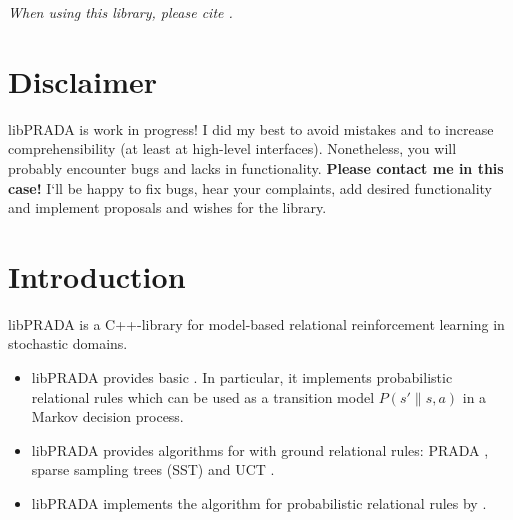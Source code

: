 \documentclass[10pt,twoside,twocolumn,fleqn]{article}
\begin{document}
\maketitle

\begin{center}
\emph{When using this library, please cite \citet{lang-toussaint-10jair}.}
\end{center}

\tableofcontents





\section{Disclaimer}

libPRADA is work in progress! I did my best to avoid mistakes and to increase
comprehensibility (at least at high-level interfaces). Nonetheless, you
will probably encounter bugs and lacks in functionality. \textbf{Please contact
me in this case!} I`ll be happy to fix bugs, hear your complaints, add
desired functionality and implement proposals and wishes for the library.



\section{Introduction}

libPRADA is a C++-library for model-based relational reinforcement
learning in stochastic domains.
\begin{itemize}
\item libPRADA provides basic . In particular, it
implements probabilistic relational rules which can be used as a transition
model $P(s'\|s,a)$ in a Markov decision process.

\item libPRADA provides algorithms for  with ground
relational rules: PRADA \citep{lang-toussaint-10jair}, sparse sampling 
trees (SST) \citep{kearns02ss} and UCT \citep{kocsis06uct}.

\item libPRADA implements the algorithm for 
probabilistic relational rules by \citet{pasula07ai}.
\end{itemize}
\end{document}
